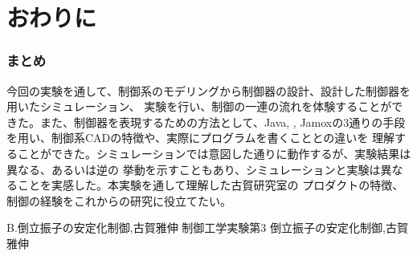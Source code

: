 \chapter{おわりに}
\subsection{まとめ}
今回の実験を通して、制御系のモデリングから制御器の設計、設計した制御器を用いたシミュレーション、
実験を行い、制御の一連の流れを体験することができた。また、制御器を表現するための方法として、Java,
\MaTX{}, Jamoxの3通りの手段を用い、制御系CADの特徴や、実際にプログラムを書くこととの違いを
理解することができた。シミュレーションでは意図した通りに動作するが、実験結果は異なる、あるいは逆の
挙動を示すこともあり、シミュレーションと実験は異なることを実感した。本実験を通して理解した古賀研究室の
プロダクトの特徴、制御の経験をこれからの研究に役立てたい。

\begin{thebibliography}{2}
 B.倒立振子の安定化制御,古賀雅伸
 制御工学実験第3 倒立振子の安定化制御,古賀雅伸
\end{thebibliography}

